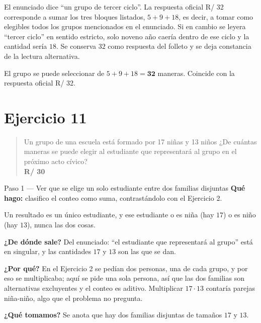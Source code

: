 \documentclass[11pt]{article}
\begin{document}
\begin{nota}
El enunciado dice ``un grupo de tercer ciclo''. La respuesta oficial R/ 32 corresponde a sumar los tres bloques listados, $5+9+18$, es decir, a tomar como elegibles todos los grupos mencionados en el enunciado. Si en cambio se leyera ``tercer ciclo'' en sentido estricto, solo noveno año caería dentro de ese ciclo y la cantidad sería $18$. Se conserva $32$ como respuesta del folleto y se deja constancia de la lectura alternativa.
\end{nota}

\begin{resp}
El grupo se puede seleccionar de $5+9+18=\mathbf{32}$ maneras. Coincide con la respuesta oficial R/ 32.
\end{resp}

\section*{Ejercicio 11}

\begin{quote}
Un grupo de una escuela está formado por 17 niñas y 13 niños ¿De cuántas maneras se puede elegir al estudiante que representará al grupo en el próximo acto cívico?\\[2pt]
\textbf{R/ 30}
\end{quote}

\begin{paso}{Paso 1 --- Ver que se elige un solo estudiante entre dos familias disjuntas}
\textbf{Qué hago:} clasifico el conteo como suma, contrastándolo con el Ejercicio 2.

Un resultado es un único estudiante, y ese estudiante o es niña (hay $17$) o es niño (hay $13$), nunca las dos cosas.

\textbf{¿De dónde sale?} Del enunciado: ``el estudiante que representará al grupo'' está en singular, y las cantidades $17$ y $13$ son las que se dan.

\textbf{¿Por qué?} En el Ejercicio 2 se pedían dos personas, una de cada grupo, y por eso se multiplicaba; aquí se pide una sola persona, así que las dos familias son alternativas excluyentes y el conteo es aditivo. Multiplicar $17\cdot 13$ contaría parejas niña-niño, algo que el problema no pregunta.

\textbf{¿Qué tomamos?} Se anota que hay dos familias disjuntas de tamaños $17$ y $13$.
\end{paso}
\end{document}
